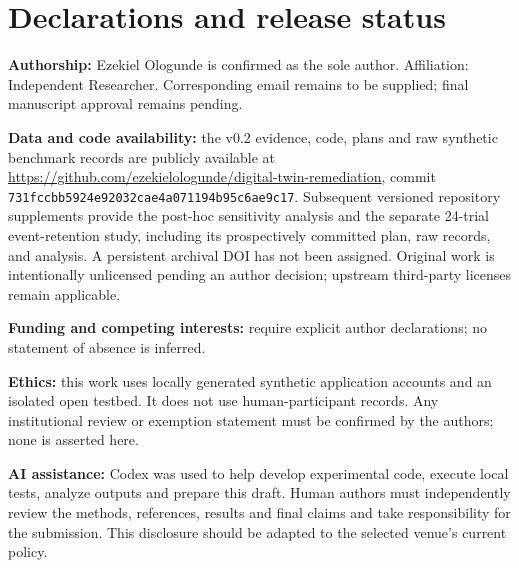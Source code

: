 \documentclass[manuscript,review,nonacm]{acmart}
\begin{document}
\section*{Declarations and release status}
\textbf{Authorship:} Ezekiel Ologunde is confirmed as the sole author. Affiliation: Independent Researcher. Corresponding email remains to be supplied; final manuscript approval remains pending.

\textbf{Data and code availability:} the v0.2 evidence, code, plans and raw synthetic benchmark records are publicly available at \url{https://github.com/ezekielologunde/digital-twin-remediation}, commit \texttt{731fccbb5924e92032cae4a071194b95c6ae9c17}. Subsequent versioned repository supplements provide the post-hoc sensitivity analysis and the separate 24-trial event-retention study, including its prospectively committed plan, raw records, and analysis. A persistent archival DOI has not been assigned. Original work is intentionally unlicensed pending an author decision; upstream third-party licenses remain applicable.

\textbf{Funding and competing interests:} require explicit author declarations; no statement of absence is inferred.

\textbf{Ethics:} this work uses locally generated synthetic application accounts and an isolated open testbed. It does not use human-participant records. Any institutional review or exemption statement must be confirmed by the authors; none is asserted here.

\textbf{AI assistance:} Codex was used to help develop experimental code, execute local tests, analyze outputs and prepare this draft. Human authors must independently review the methods, references, results and final claims and take responsibility for the submission. This disclosure should be adapted to the selected venue's current policy.
\end{document}
